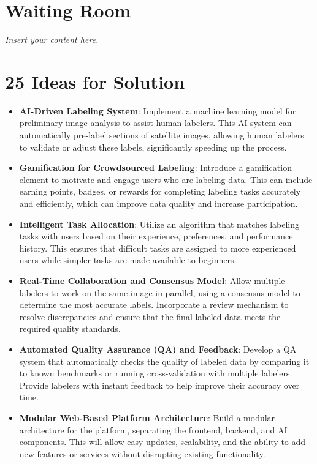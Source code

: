 \documentclass[12pt]{article}
\newcommand{\lips}{\textit{Insert your content here.}}
\begin{document}
\section{Waiting Room}
\lips

\section*{25 Ideas for Solution}

\begin{itemize} 
    \item \textbf{AI-Driven Labeling System}: Implement a machine learning model for preliminary image analysis to assist human labelers. This AI system can automatically pre-label sections of satellite images, allowing human labelers to validate or adjust these labels, significantly speeding up the process.
    
    \item \textbf{Gamification for Crowdsourced Labeling}: Introduce a gamification element to motivate and engage users who are labeling data. This can include earning points, badges, or rewards for completing labeling tasks accurately and efficiently, which can improve data quality and increase participation.
    
    \item \textbf{Intelligent Task Allocation}: Utilize an algorithm that matches labeling tasks with users based on their experience, preferences, and performance history. This ensures that difficult tasks are assigned to more experienced users while simpler tasks are made available to beginners.
    
    \item \textbf{Real-Time Collaboration and Consensus Model}: Allow multiple labelers to work on the same image in parallel, using a consensus model to determine the most accurate labels. Incorporate a review mechanism to resolve discrepancies and ensure that the final labeled data meets the required quality standards.
    
    \item \textbf{Automated Quality Assurance (QA) and Feedback}: Develop a QA system that automatically checks the quality of labeled data by comparing it to known benchmarks or running cross-validation with multiple labelers. Provide labelers with instant feedback to help improve their accuracy over time.
    
    \item \textbf{Modular Web-Based Platform Architecture}: Build a modular architecture for the platform, separating the frontend, backend, and AI components. This will allow easy updates, scalability, and the ability to add new features or services without disrupting existing functionality.
    

\end{itemize}
\end{document}
